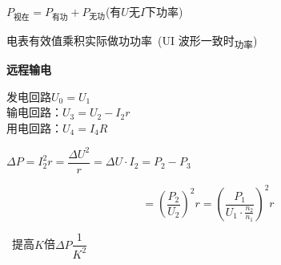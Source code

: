 \noindent $P_{\text{视在}}=P_{\text{有功}}+P_{\text{无功}}$\quad (有$U$无$I$下\textsuperscript{}功率)%

\noindent 电表有效值乘积\quad 实际做功功率\ (UI 波形一致时\textsubscript{功率})%

\noindent {}
\textbf{远程输电}

\noindent 发电回路\quad $U_0=U_1$\\
输电回路：$U_3=U_2-I_2r$\\
用电回路：$U_4=I_4R$

\noindent {}%
\quad $\Delta P=I_2^2r=\dfrac{\Delta U^2}{r}=\Delta U\cdot I_2=P_2-P_3$

\[
=\left(\frac{P_2}{U_2}\right)^2r=\left(\frac{P_1}{U_1\cdot\frac{n_2}{n_1}}\right)^2r
\]%

\noindent {}\ 提高$K$倍\quad $\Delta P$$\dfrac{1}{K^2}$%

\noindent {}
